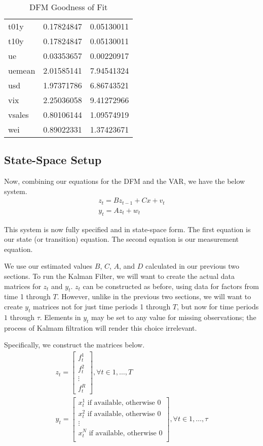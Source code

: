 \documentclass[11pt, letterpaper]{article}\usepackage[]{graphicx}\usepackage[]{color}
\begin{document}
\begin{table}[H]
\begin{tabular}{lrr}
  t01y & 0.17824847 & 0.05130011 \\ 
  t10y & 0.17824847 & 0.05130011 \\ 
  ue & 0.03353657 & 0.00220917 \\ 
  uemean & 2.01585141 & 7.94541324 \\ 
  usd & 1.97371786 & 6.86743521 \\ 
  vix & 2.25036058 & 9.41272966 \\ 
  vsales & 0.80106144 & 1.09574919 \\ 
  wei & 0.89022331 & 1.37423671 \\ 
   \hline
\end{tabular}
\endgroup
\caption{DFM Goodness of Fit} 
\end{table}





\subsection{State-Space Setup}
Now, combining our equations for the DFM and the VAR, we have the below system.
\begin{align*}
z_t = B z_{t-1} + Cx + v_t\\
y_t = A z_t + w_t
\end{align*}

This system is now fully specified and in state-space form. The first equation is our state (or transition) equation. The second equation is our measurement equation. 

We use our estimated values $B$, $C$, $A$, and $D$ calculated in our previous two sections. To run the Kalman Filter, we will want to create the actual data matrices for $z_t$ and $y_t$. $z_t$ can be constructed as before, using data for factors from time 1 through $T$. However, unlike in the previous two sections, we will want to create $y_t$ matrices not for just time periods 1 through $T$, but now for time periods $1$ through $\tau$. Elements in $y_t$ may be set to any value for missing observations; the process of Kalmam filtration will render this choice irrelevant.

Specifically, we construct the matrices below.
\begin{align*}
z_t
=
\begin{bmatrix}
	f^1_{t}\\
	f^2_{t}\\
	\vdots \\
	f^R_{t}
\end{bmatrix}, \forall t \in 1, \dots, T\\
y_t
=
\begin{bmatrix}
	\text{$x^1_{t}$ if available, otherwise 0}\\
	\text{$x^2_{t}$ if available, otherwise 0}\\
	\vdots \\
	\text{$x^N_{t}$ if available, otherwise 0}\\
\end{bmatrix}, \forall t \in 1, \dots, \tau
\end{align*}
\end{document}
